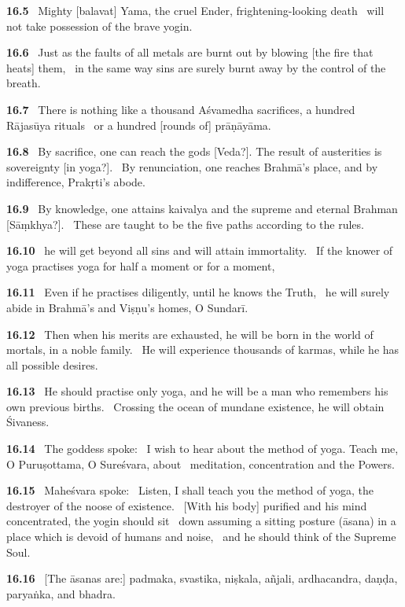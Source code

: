 \documentclass{article}
\begin{document}
\textbf{16.5}%
\ Mighty [balavat] Yama, the cruel Ender, frightening-looking death%
\ will not take possession of the brave yogin.%


\textbf{16.6}%
\ Just as the faults of all metals are burnt out by blowing [the fire that heats] them,%
\ in the same way sins are surely burnt away by the control of the breath.%


\textbf{16.7}%
\ There is nothing like a thousand Aśvamedha sacrifices, a hundred Rājasūya rituals%
\ or a hundred [rounds of] prāṇāyāma.%


\textbf{16.8}%
\ By sacrifice, one can reach the gods [Veda?]. The result of austerities is sovereignty [in yoga?].%
\                  By renunciation, one reaches Brahmā's place, and by indifference, Prakṛti's abode.%


\textbf{16.9}%
\ By knowledge, one attains kaivalya and the supreme and eternal Brahman [Sāṃkhya?].%
\                  These are taught to be the five paths according to the rules.%


\textbf{16.10}%
\ he will get beyond all sins and will attain immortality.%
\                  If the knower of yoga practises yoga for half a moment or for a moment,%


\textbf{16.11}%
\ Even if he practises diligently, until he knows the Truth,%
\                  he will surely abide in Brahmā's and Viṣṇu's homes, O Sundarī.%


\textbf{16.12}%
\ Then when his merits are exhausted, he will be born in the world of mortals, in a noble family.%
\                  He will experience thousands of karmas, while he has all possible desires.%


\textbf{16.13}%
\ He should practise only yoga, and he will be a man who remembers his own previous births.%
\                  Crossing the ocean of mundane existence, he will obtain Śivaness.%


\textbf{16.14}%
\ The goddess spoke:%
\ I wish to hear about the method of yoga. Teach me, O Puruṣottama, O Sureśvara, about%
\ meditation, concentration and the Powers.%


\textbf{16.15}%
\ Maheśvara spoke:%
\ Listen, I shall teach you the method of yoga, the destroyer of the noose of existence.%
\ [With his body] purified and his mind concentrated, the yogin should sit%
\                 down assuming a sitting posture (āsana) in a place which is devoid of humans and noise,%
\ and he should think of the Supreme Soul.%


\textbf{16.16}%
\ [The āsanas are:] padmaka, svastika, niṣkala, añjali, ardhacandra, daṇḍa, paryaṅka, and bhadra.%
\end{document}

